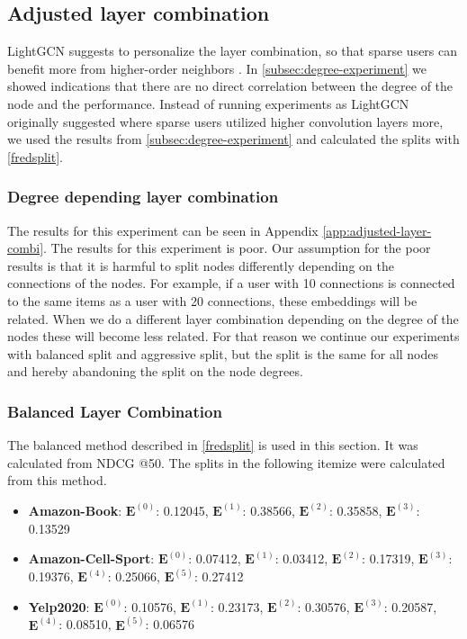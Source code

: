 \subsection{Adjusted layer combination}
LightGCN suggests to personalize the layer combination, so that sparse users can benefit more from higher-order neighbors \cite{lightgcn}.
In \autoref{subsec:degree-experiment} we showed indications that there are no direct correlation between the degree of the node and the performance.
Instead of running experiments as LightGCN originally suggested where sparse users utilized higher convolution layers more, we used the results from \autoref{subsec:degree-experiment} and calculated the splits with \autoref{fredsplit}.
\subsubsection{Degree depending layer combination}
The results for this experiment can be seen in Appendix \ref{app:adjusted-layer-combi}.
The results for this experiment is poor.
Our assumption for the poor results is that it is harmful to split nodes differently depending on the connections of the nodes.
For example, if a user with 10 connections is connected to the same items as a user with 20 connections, these embeddings will be related.
When we do a different layer combination depending on the degree of the nodes these will become less related.
For that reason we continue our experiments with balanced split and aggressive split, but the split is the same for all nodes and hereby abandoning the split on the node degrees.

\subsubsection{Balanced Layer Combination}
The balanced method described in \autoref{fredsplit} is used in this section.
It was calculated from NDCG @50.
The splits in the following itemize were calculated from this method.
\begin{itemize}
    \item \textbf{Amazon-Book}: $\mathbf{E}^{(0)}$: 0.12045, $\mathbf{E}^{(1)}$: 0.38566, $\mathbf{E}^{(2)}$: 0.35858, $\mathbf{E}^{(3)}$:  0.13529
    \item \textbf{Amazon-Cell-Sport}: $\mathbf{E}^{(0)}$: 0.07412, $\mathbf{E}^{(1)}$: 0.03412, $\mathbf{E}^{(2)}$: 0.17319, $\mathbf{E}^{(3)}$:  0.19376, $\mathbf{E}^{(4)}$: 0.25066, $\mathbf{E}^{(5)}$: 0.27412
    \item \textbf{Yelp2020}: $\mathbf{E}^{(0)}$: 0.10576, $\mathbf{E}^{(1)}$: 0.23173, $\mathbf{E}^{(2)}$: 0.30576, $\mathbf{E}^{(3)}$: 0.20587, $\mathbf{E}^{(4)}$: 0.08510, $\mathbf{E}^{(5)}$: 0.06576
\end{itemize}

